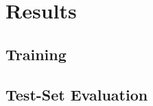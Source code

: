\section{Results}
\label{sec:results}

\subsection{Training}
\label{sec:training}

\subsection{Test-Set Evaluation}
\label{sec:test}